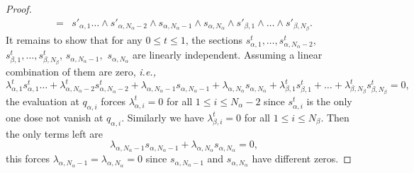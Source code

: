 \documentclass[10pt,a4paper]{amsart}
\begin{document}
\begin{proof}
\begin{equation*}
\begin{split}
        =&s'_{\alpha,1}\dots \wedge s'_{\alpha,N_\alpha-2} \wedge s_{\alpha,N_\alpha-1}\wedge s_{\alpha,N_\alpha}\wedge s'_{\beta,1}\wedge \dots \wedge s'_{\beta,N_\beta}.
    \end{split}
     \end{equation*}
    It remains to show that for any $0\le t \le 1$, the sections $s^t_{\alpha,1},\dots, s^t_{\alpha,N_\alpha-2}$, $s^t_{\beta,1}, \dots , s^t_{\beta,N_\beta}$, $ s_{\alpha,N_\alpha-1},$ $s_{\alpha,N_\alpha}$ are linearly independent. Assuming a linear combination of them are zero, \textit{i.e.,}
    $$
    \lambda^t_{\alpha,1}s^t_{\alpha,1}\dots + \lambda^t_{\alpha,N_\alpha-2}s^t_{\alpha,N_\alpha-2}+ \lambda_{\alpha,N_\alpha-1} s_{\alpha,N_\alpha-1}+ \lambda_{\alpha,N_\alpha} s_{\alpha,N_\alpha}+ \lambda^t_{\beta,1} s^t_{\beta,1}+ \dots + \lambda^t_{\beta,N_\beta} s^t_{\beta,N_\beta}=0,
    $$
    the evaluation at $q_{\alpha,i}$ forces $\lambda^t_{\alpha,i}=0$ for all $1\le i \le N_\alpha-2$ since $s^t_{\alpha,i}$ is the only one dose not vanish at $q_{\alpha,i}$. Similarly we have $\lambda^t_{\beta,i}=0$ for all $1\le i \le N_\beta$. Then the only terms left are 
    $$\lambda_{\alpha,N_\alpha-1} s_{\alpha,N_\alpha-1}+ \lambda_{\alpha,N_\alpha} s_{\alpha,N_\alpha}=0,$$ this forces $\lambda_{\alpha,N_\alpha-1}=\lambda_{\alpha,N_\alpha}=0$ since $s_{\alpha,N_\alpha-1}$ and $s_{\alpha,N_\alpha}$ have different zeros.
\end{proof}
\end{document}
